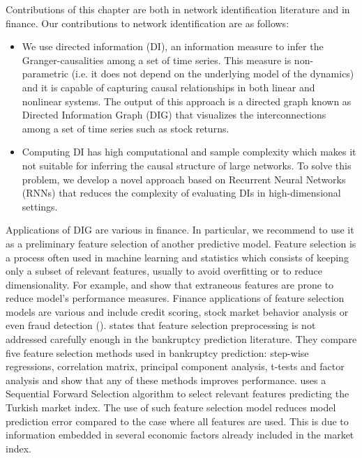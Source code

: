 \clearpage
Contributions of this chapter are both in network identification literature and in finance.
Our contributions to network identification are as follows:
\begin{itemize}
    \item We use directed information (DI), an information measure to infer the Granger-causalities among a set of time series. 
This measure is non-parametric (i.e. it does not depend on the underlying model of the dynamics) and it is capable of capturing causal relationships in both linear and nonlinear systems. The output of this approach is a directed graph known as Directed Information Graph (DIG) that visualizes the interconnections among a set of time series such as stock returns. 

\item Computing DI has high computational and sample complexity which makes it not suitable for inferring the causal structure of large networks. 
To solve this problem, we develop a novel approach based on Recurrent Neural Networks (RNNs) that reduces the complexity of evaluating DIs in high-dimensional settings. 
\end{itemize}



Applications of DIG are various in finance. 
In particular, we recommend to use it as a preliminary feature selection of another predictive model. Feature selection is a process often used in machine learning and statistics which consists of keeping only a subset of relevant features, usually to avoid overfitting or to reduce dimensionality. 
For example, \citet{fs1} and \citet{fs2} show that extraneous features are prone to reduce model's performance measures. 
Finance applications of feature selection models are various and include credit scoring, stock market behavior analysis  or even fraud detection (\citet{fs_fraud}).
\citet{tsai2009} states that feature selection preprocessing is not addressed carefully enough in the bankruptcy prediction literature. They compare five feature selection methods used in bankruptcy prediction: step-wise regressions, correlation matrix, principal component analysis, t-tests and factor analysis and show that any of these methods improves performance. 
\citet{fs_stock} uses a Sequential Forward Selection algorithm to select relevant features predicting the Turkish market index. The use of such feature selection model reduces model prediction error compared to the case where all features are used. This is due to information embedded in several economic factors already included in the market index. 

